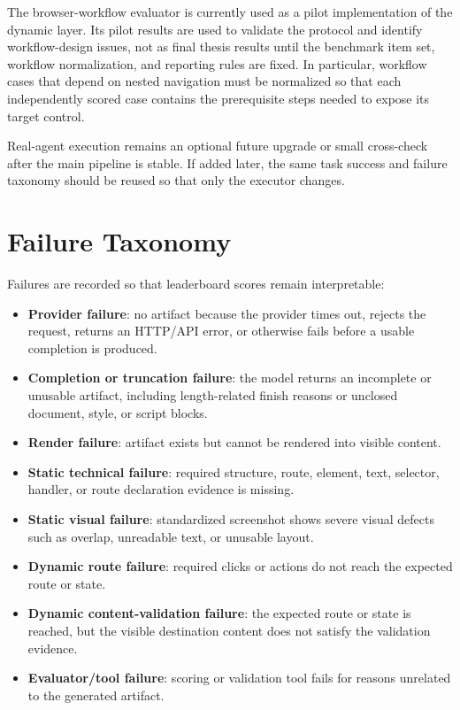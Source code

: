 The browser-workflow evaluator is currently used as a pilot implementation of
the dynamic layer. Its pilot results are used to validate the protocol and
identify workflow-design issues, not as final thesis results until the benchmark
item set, workflow normalization, and reporting rules are fixed. In particular,
workflow cases that depend on nested navigation must be normalized so that each
independently scored case contains the prerequisite steps needed to expose its
target control.

Real-agent execution remains an optional future upgrade or small cross-check
after the main pipeline is stable. If added later, the same task success and
failure taxonomy should be reused so that only the executor changes.

\section{Failure Taxonomy}
\label{sec:failure-taxonomy}

Failures are recorded so that leaderboard scores remain interpretable:

\begin{itemize}
  \item \textbf{Provider failure}: no artifact because the provider times out,
  rejects the request, returns an HTTP/API error, or otherwise fails before a
  usable completion is produced.
  \item \textbf{Completion or truncation failure}: the model returns an
  incomplete or unusable artifact, including length-related finish reasons or
  unclosed document, style, or script blocks.
  \item \textbf{Render failure}: artifact exists but cannot be rendered into
  visible content.
  \item \textbf{Static technical failure}: required structure, route, element,
  text, selector, handler, or route declaration evidence is missing.
  \item \textbf{Static visual failure}: standardized screenshot shows severe
  visual defects such as overlap, unreadable text, or unusable layout.
  \item \textbf{Dynamic route failure}: required clicks or actions do not reach
  the expected route or state.
  \item \textbf{Dynamic content-validation failure}: the expected route or state
  is reached, but the visible destination content does not satisfy the
  validation evidence.
  \item \textbf{Evaluator/tool failure}: scoring or validation tool fails for
  reasons unrelated to the generated artifact.
\end{itemize}

